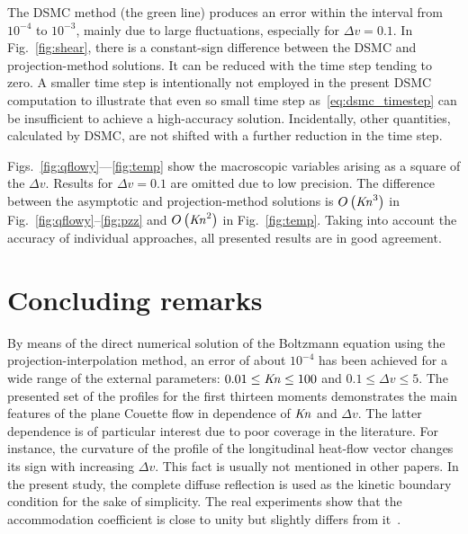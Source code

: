 \documentclass[final]{jfm} %
\newcommand{\Kn}{\mbox{\textit{Kn}}}
\newcommand{\OO}[1]{O\left(#1\right)}
\begin{document}
The DSMC method (the green line) produces an error within the interval from \(10^{-4}\) to \(10^{-3}\),
mainly due to large fluctuations, especially for \(\Delta{v}=0.1\).
In Fig.~\ref{fig:shear}, there is a constant-sign difference
between the DSMC and projection-method solutions.
It can be reduced with the time step tending to zero.
A smaller time step is intentionally not employed in the present DSMC computation
to illustrate that even so small time step as~\eqref{eq:dsmc_timestep} can be insufficient
to achieve a high-accuracy solution.
Incidentally, other quantities, calculated by DSMC, are not shifted with
a further reduction in the time step.

Figs.~\ref{fig:qflowy}---\ref{fig:temp} show the macroscopic variables
arising as a square of the \(\Delta{v}\).
Results for \(\Delta{v}=0.1\) are omitted due to low precision.
The difference between the asymptotic and projection-method solutions
is \(\OO{\Kn^3}\) in Fig.~\ref{fig:qflowy}--\ref{fig:pzz} and \(\OO{\Kn^2}\) in Fig.~\ref{fig:temp}.
Taking into account the accuracy of individual approaches,
all presented results are in good agreement.

\section{Concluding remarks}

By means of the direct numerical solution of the Boltzmann equation using the projection-interpolation method,
an error of about \(10^{-4}\) has been achieved for a wide range of the external parameters:
\(0.01 \le \Kn \le 100\) and \(0.1 \le \Delta{v} \le 5\).
The presented set of the profiles for the first thirteen moments demonstrates
the main features of the plane Couette flow in dependence of \(\Kn\) and \(\Delta{v}\).
The latter dependence is of particular interest due to poor coverage in the literature.
For instance, the curvature of the profile of the longitudinal heat-flow vector
changes its sign with increasing \(\Delta{v}\).
This fact is usually not mentioned in other papers.
In the present study, the complete diffuse reflection is used as the kinetic boundary condition
for the sake of simplicity. The real experiments show that the accommodation coefficient
is close to unity but slightly differs from it~\citep{Agrawal2008}.
\end{document}

